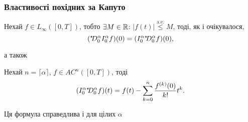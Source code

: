 \subsubsection{Властивості похідних за Капуто}
\begin{theorem}
    Нехай $f \in L_\infty([0,T])$, тобто $\exists M \in \mathbb{R}$: $|f(t)| \overset{\text{a.e.}}{\le} M$, тоді, як і очікувалося,
    \begin{equation}
        ({}^{\star\!\!}D_0^{\alpha} I_0^{\alpha} f)(0) = (I_0^{\alpha} {}^{\star\!\!}D_0^{\alpha} f)(0),
    \end{equation}
\end{theorem}
а також
\begin{theorem}
    Нехай $n = \lceil \alpha \rceil$, $f \in AC^n([0,T])$, тоді
    \begin{equation}
        (I_0^{\alpha} {}^{\star\!\!}D_0^{\alpha} f)(t) = f(t) - \sum_{k = 0}^n \frac{f^{(k)}(0)}{k!} t^k.
    \end{equation}
\end{theorem}
\begin{remark}
    Ця формула справедлива і для цілих $\alpha$
\end{remark}

